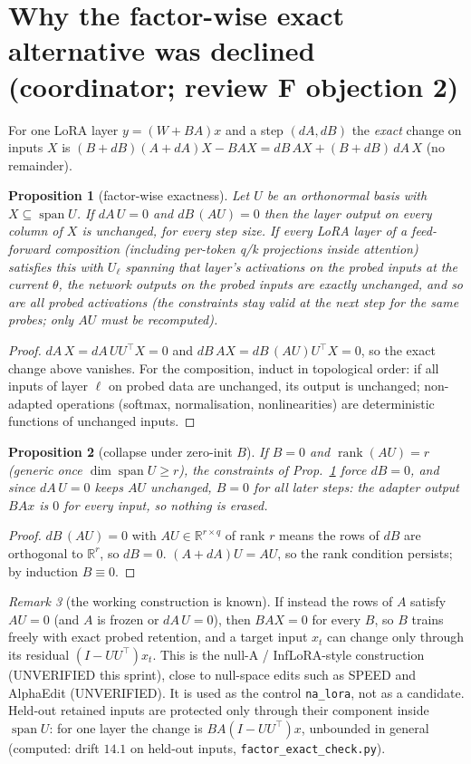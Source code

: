 \documentclass[11pt]{article}
\newtheorem{proposition}{Proposition}
\theoremstyle{remark}
\newtheorem{remark}[proposition]{Remark}
\begin{document}
\section{Why the factor-wise exact alternative was declined (coordinator; review F objection 2)}
For one LoRA layer $y=(W+BA)x$ and a step $(dA,dB)$ the \emph{exact} change on inputs $X$ is
$(B+dB)(A+dA)X-BAX=dB\,AX+(B+dB)\,dA\,X$ (no remainder).
\begin{proposition}[factor-wise exactness]\label{p:fx}
Let $U$ be an orthonormal basis with $X\subseteq\operatorname{span}U$. If $dA\,U=0$ and $dB\,(AU)=0$ then the layer output on
every column of $X$ is unchanged, for every step size. If every LoRA layer of a feed-forward composition (including
per-token q/k projections inside attention) satisfies this with $U_\ell$ spanning that layer's activations on the probed
inputs at the current $\theta$, the network outputs on the probed inputs are exactly unchanged, and so are all probed activations
(the constraints stay valid at the next step for the same probes; only $AU$ must be recomputed).
\end{proposition}
\begin{proof} $dA\,X=dA\,UU^\top X=0$ and $dB\,AX=dB\,(AU)U^\top X=0$, so the exact change above vanishes. For the composition,
induct in topological order: if all inputs of layer $\ell$ on probed data are unchanged, its output is unchanged; non-adapted
operations (softmax, normalisation, nonlinearities) are deterministic functions of unchanged inputs. \end{proof}
\begin{proposition}[collapse under zero-init $B$]\label{p:collapse}
If $B=0$ and $\operatorname{rank}(AU)=r$ (generic once $\dim\operatorname{span}U\ge r$), the constraints of Prop.~\ref{p:fx} force
$dB=0$, and since $dA\,U=0$ keeps $AU$ unchanged, $B=0$ for all later steps: the adapter output $BAx$ is $0$ for every input,
so nothing is erased. \end{proposition}
\begin{proof} $dB\,(AU)=0$ with $AU\in\mathbb{R}^{r\times q}$ of rank $r$ means the rows of $dB$ are orthogonal to $\mathbb{R}^r$,
so $dB=0$. $(A+dA)U=AU$, so the rank condition persists; by induction $B\equiv0$. \end{proof}
\begin{remark}[the working construction is known] If instead the rows of $A$ satisfy $AU=0$ (and $A$ is frozen or $dA\,U=0$),
then $BAX=0$ for every $B$, so $B$ trains freely with exact probed retention, and a target input $x_t$ can change only through
its residual $(I-UU^\top)x_t$. This is the null-A / InfLoRA-style construction (UNVERIFIED this sprint), close to null-space
edits such as SPEED and AlphaEdit (UNVERIFIED). It is used as the control \texttt{na\_lora}, not as a candidate. Held-out retained
inputs are protected only through their component inside $\operatorname{span}U$: for one layer the change is
$BA(I-UU^\top)x$, unbounded in general (computed: drift $14.1$ on held-out inputs, \texttt{factor\_exact\_check.py}).\end{remark}
\end{document}
